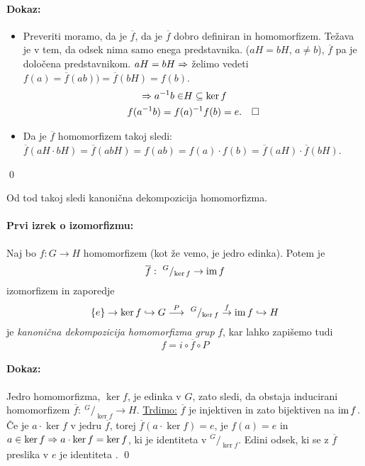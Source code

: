 \paragraph{Dokaz:}
\begin{itemize}
	\item{Preveriti moramo, da je $\overline{f}$, da je $\overline{f}$ dobro definiran in homomorfizem. Te\v zava
	je v tem, da odsek nima samo enega predstavnika. ($aH = bH$, $a \neq b$), $\overline{f}$ pa je dolo\v cena 
	predstavnikom. $aH = bH \Rightarrow$ \v zelimo vedeti $f(a) = \overline{f}(ab) ) = \overline{f}(bH) = f (b)$.
	\begin{align*}
		\Rightarrow a^{-1}b \in &H \subseteq \ker f \\
		f(a^{-1}b) = f(&a)^{-1} f(b) = e. \quad \square
	\end{align*}}
	\item{Da je $\overline{f}$ homomorfizem takoj sledi: $\overline{f}(aH \cdot bH) = \overline{f}(abH) = f(ab) = f(a)
		\cdot f(b) = \overline{f}(aH) \cdot \overline{f}(bH)$.}
\end{itemize}
\qed

Od tod takoj sledi kanoni\v cna dekompozicija homomorfizma.
\begin{trditev}
	\paragraph{Prvi izrek o izomorfizmu:} Naj bo $f:G \to H$ homomorfizem (kot \v ze vemo, je jedro edinka). Potem je
	\[
		\overline{f}:\ ^G/_{\ker f} \to \operatorname{im} f
	\] izomorfizem in zaporedje
	\[
		\{e\} \to \ker f \hookrightarrow G \stackrel{P}{\longrightarrow}\ ^G/_{\ker f} \stackrel{f}{\to} \operatorname{im} f \hookrightarrow H
	\] je \emph{kanoni\v cna dekompozicija homomorfizma grup} $f$, kar lahko zapi\v semo tudi
	\[
		f = i \circ \overline{f} \circ P
	\]
\end{trditev}

\paragraph{Dokaz:} Jedro homomorfizma, $\ker f$, je edinka v $G$, zato sledi, da obstaja inducirani homomorfizem $\overline{f}:\ ^G/_{\ker f} \to H$.
\underline{Trdimo:} $\overline{f}$ je injektiven in zato bijektiven na $\operatorname{im} f$. \v Ce je $a\cdot \ker f$ v jedru $\overline{f}$, torej
$\overline{f}(a\cdot \ker f) = e$, je $f(a) = e$ in $a \in \ker f \Rightarrow a\cdot \ker f = \ker f$, ki je identiteta v $^G/_{\ker f}$.
Edini odsek, ki se z $\overline{f}$ preslika v $e$ je identiteta .
\qed

